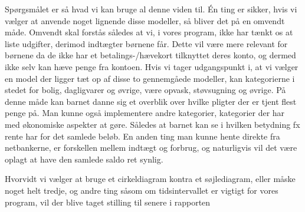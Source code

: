 Spørgsmålet er så hvad vi kan bruge al denne viden til. Én ting er sikker, hvis vi vælger at anvende noget lignende disse modeller, så bliver det på en omvendt måde. Omvendt skal forstås således at vi, i vores program, ikke har tænkt os at liste udgifter, derimod indtægter børnene får. Dette vil være mere relevant for børnene da de ikke har et betalings-/hævekort tilknyttet deres konto, og dermed ikke selv kan hæve penge fra kontoen. Hvis vi tager udgangspunkt i, at vi vælger en model der ligger tæt op af disse to gennemgåede modeller, kan kategorierne i stedet for bolig, dagligvarer og øvrige, være opvask, støvsugning og øvrige. På denne måde kan barnet danne sig et overblik over hvilke pligter der er tjent flest penge på. Man kunne også implementere andre kategorier, kategorier der har med økonomiske aspekter at gøre. Således at barnet kan se i hvilken betydning fx rente har for det samlede beløb. En anden ting man kunne hente direkte fra netbankerne, er forskellen mellem indtægt og forbrug, og naturligvis vil det være oplagt at have den samlede saldo ret synlig. 

Hvorvidt vi vælger at bruge et cirkeldiagram kontra et søjlediagram, eller måske noget helt tredje, og andre ting såsom om tidsintervallet er vigtigt for vores program, vil der blive taget stilling til senere i rapporten


















